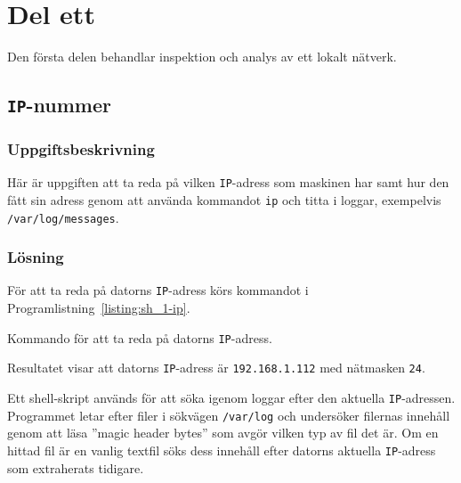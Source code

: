 %
%
%


\section{Del ett}
Den första delen behandlar inspektion och analys av ett lokalt nätverk.


\subsection{\texttt{IP}-nummer}
\subsubsection{Uppgiftsbeskrivning}
Här är uppgiften att ta reda på vilken \texttt{IP}-adress som maskinen har samt
hur den fått sin adress genom att använda kommandot \texttt{ip} och titta i
loggar, exempelvis \texttt{/var/log/messages}.


\subsubsection{Lösning}
För att ta reda på datorns \texttt{IP}-adress körs kommandot i
Programlistning~\ref{listing:sh_1-ip}.

\begin{listing}[H]
  \caption{Kommando för att ta reda på datorns \texttt{IP}-adress.}
  \label{listing:sh_1-ip}
\end{listing}

Resultatet visar att datorns \texttt{IP}-adress är \texttt{192.168.1.112}
med nätmasken \texttt{24}.

Ett shell-skript används för att söka igenom loggar efter den aktuella
\texttt{IP}-adressen. Programmet letar efter filer i sökvägen \texttt{/var/log}
och undersöker filernas innehåll genom att läsa ''magic header bytes'' som
avgör vilken typ av fil det är. Om en hittad fil är en vanlig textfil söks dess
innehåll efter datorns aktuella \texttt{IP}-adress som extraherats tidigare.

